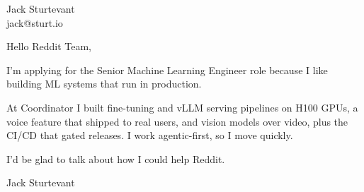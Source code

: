 \documentclass[11pt]{article}
\begin{document}
\raggedright

{\namefont\fontsize{20pt}{24pt}\selectfont Jack Sturtevant}\\[-0.3em]
jack@sturt.io

\vspace{1.2em}

Hello Reddit Team,

I'm applying for the Senior Machine Learning Engineer role because I like building ML systems that run in production.

At Coordinator I built fine-tuning and vLLM serving pipelines on H100 GPUs, a voice feature that shipped to real users, and vision models over video, plus the CI/CD that gated releases. I work agentic-first, so I move quickly.

I'd be glad to talk about how I could help Reddit.

\vspace{0.6em}
Jack Sturtevant
\end{document}
